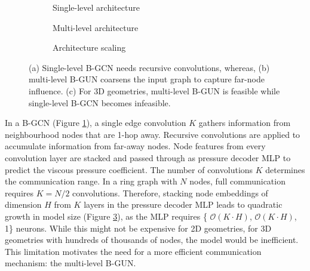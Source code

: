\documentclass{marine_2025_paper_template}
\begin{document}
\begin{figure}[t]
    \centering
    \hspace{-1cm}
    \begin{subfigure}{.228\textwidth}
        \centering
        
        \caption{Single-level architecture}
        \label{fig:bgcn_architecture}
    \end{subfigure}
    \hspace{0.3cm}
    \begin{subfigure}{.37\textwidth}
        \centering
        \raisebox{0.5cm}{}
        \caption{Multi-level architecture}
        \label{fig:bgun_architecture}
    \end{subfigure}
    \hspace{0.6cm}
    \begin{subfigure}{.24\textwidth}
        \centering
        \raisebox{-0.05cm}{}
        \caption{Architecture scaling}
        \label{fig:scaling_bgcn_bgun}
    \end{subfigure}
    \vspace{-0.2cm}
    \caption{ (a) Single-level B-GCN needs recursive convolutions, whereas, (b) multi-level B-GUN coarsens the input graph to capture far-node influence. (c) For 3D geometries, multi-level B-GUN is feasible while single-level B-GCN becomes infeasible.}
    \label{fig:bgnn_architectures}
\end{figure}
    
    
In a B-GCN (Figure \ref{fig:bgcn_architecture}), a single edge convolution $K$ gathers information from neighbourhood nodes that are 1-hop away. Recursive convolutions are applied to accumulate information from far-away nodes. Node features from every convolution layer are stacked and passed through as pressure decoder MLP to predict the viscous pressure coefficient. The number of convolutions $K$ determines the communication range. In a ring graph with $N$ nodes, full communication requires $K=N/2$ convolutions. Therefore, stacking node embeddings of dimension $H$ from $K$ layers in the pressure decoder MLP leads to quadratic growth in model size (Figure \ref{fig:scaling_bgcn_bgun}), as the MLP requires \{ $\mathcal{O}(K \cdot H)$, $\mathcal{O}(K \cdot H)$, 1\} neurons. While this might not be expensive for 2D geometries, for 3D geometries with hundreds of thousands of nodes, the model would be inefficient. This limitation motivates the need for a more efficient communication mechanism: the multi-level B-GUN. \newline
\end{document}

